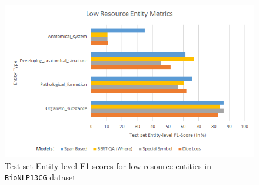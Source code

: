 \begin{figure}
    \centering
    \includegraphics[scale=0.5]{../thesis/low_resource_entity_metrics}
    \caption{Test set Entity-level F1 scores for low resource entities in \texttt{BioNLP13CG} dataset}
    \label{fig:low_resource_entity_metrics}
\end{figure}

\fi
